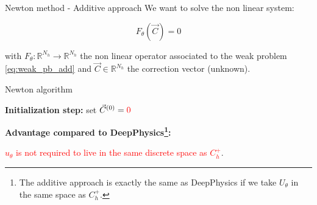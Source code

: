\begin{frame}{Newton method - Additive approach}
    \vspace{-5pt}
    We want to solve the non linear system: %

    \normalsize
    \vspace{-10pt}
    \begin{equation*}
        F_\theta(\vec{C}) = 0 
    \end{equation*}

    \vspace{-2pt}
    with $F_\theta:\mathbb{R}^{N_h} \to \mathbb{R}^{N_h}$ the non linear operator associated to the weak problem \eqref{eq:weak_pb_add} and $\vec{C}\in \mathbb{R}^{N_h}$ the correction vector (unknown).

	\setcounter{algocf}{1}
    \begin{center}
        \small
        \begin{minipage}{0.9\linewidth}
            \begin{algorithm}[H]
                \SetAlgoLined
                \caption{Newton algorithm \citep{newton_accel_2025}}
                \textbf{Initialization step:} set $\vec{C}^{(0)} = \textcolor{red}{0}$\;
            \end{algorithm}
        \end{minipage}
    \end{center}
    
    \vspace{3pt}
    \textbf{Advantage compared to DeepPhysics\footnote[frame,1]{The additive approach is exactly the same as DeepPhysics if we take $U_\theta$ in the same space as $C_h^+$.}:} 

    \vspace{-2pt}
    \begin{center}
        \textcolor{red}{$u_\theta$ is not required to live in the same discrete space as $C_h^+$}.
    \end{center}
    \vspace{8pt}
\end{frame}